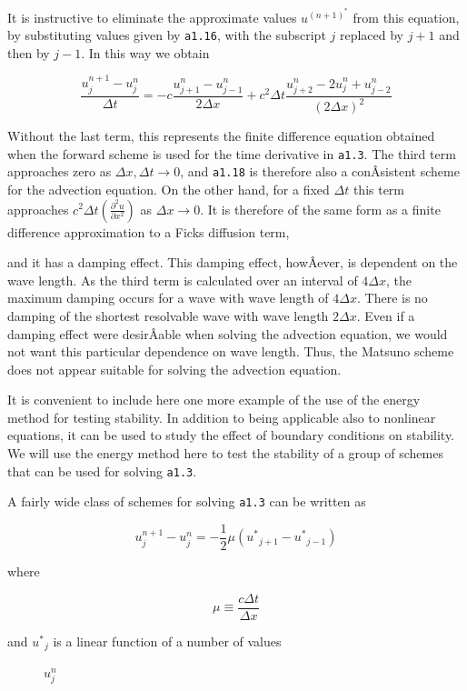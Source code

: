 It is instructive to eliminate the approximate values
\(u^{\left( n + 1 \right)^{*}}\) from this equation, by substituting
values given by \texttt{a1.16}, with the subscript \(j\) replaced by
\(j + 1\) and then by \( j - 1\). In this way we obtain

 {\[\frac{u_{j}^{n + 1} - u_{j}^{n}}{\Delta t} =
- c\frac{u_{j + 1}^{n} - u_{j - 1}^{n}}{2\Delta x} +
c^{2}\Delta t\frac{u_{j + 2}^{n} -
  {2u}_{j}^{n} + u_{j - 2}^{n}}{\left( 2\Delta x \right)^{2}}\]}

Without the last term, this represents the finite difference equation
obtained when the forward scheme is used for the time derivative in
\texttt{a1.3}. The third term approaches zero as
\(\Delta x,\Delta t \rightarrow 0\), and \texttt{a1.18} is therefore
also a conÂ­sistent scheme for the advection equation. On the other hand,
for a fixed \(\Delta t\) this term approaches
\(c^{2}\Delta t\left( \frac{\partial^{2}u}{\partial x^{2}} \right)\) as
\(\Delta x \rightarrow 0\). It is therefore of the same form as a finite
difference approximation to a Fick\textquotesingle s diffusion term,

and it has a damping effect. This damping effect, howÂ­ever, is dependent
on the wave length. As the third term is calculated over an interval of
\(4\Delta x\), the maximum damping occurs for a wave with wave length of
\(4\Delta x\). There is no damping of the shortest resolvable wave with
wave length \(2\Delta x\). Even if a damping effect were desirÂ­able when
solving the advection equation, we would not want this particular
dependence on wave length. Thus, the Matsuno scheme does not appear
suitable for solving the advection equation.

It is convenient to include here one more example of the use of the
energy method for testing stability. In addition to being applicable
also to nonlinear equations, it can be used to study the effect of
boundary conditions on stability. We will use the energy method here to
test the stability of a group of schemes that can be used for solving
\texttt{a1.3}.

A fairly wide class of schemes for solving \texttt{a1.3} can be written
as

 {\[u_{j}^{n + 1} - u_{j}^{n} = - \frac{1}{2}\mu\left( {u^{*}}_{j + 1} - {u^{*}}_{j - 1} \right)\]}

where

 {\[\mu \equiv \frac{c\Delta t}{\Delta x}\]}

\begin{description}
 \item[and \({u^{*}}_{j}\) is a linear function of a number of values]
 \(u_{j}^{n}\)
\end{description}

